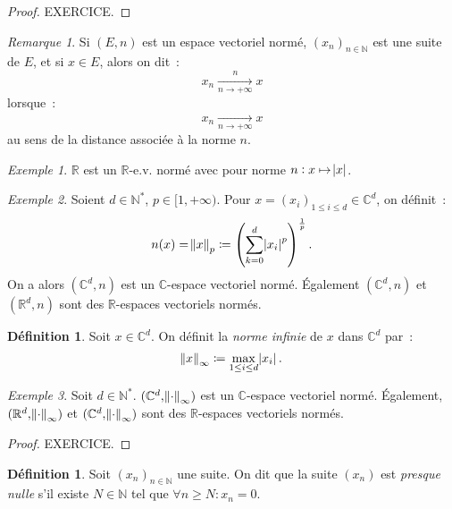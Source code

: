 \documentclass{report}
\theoremstyle{definition}
\newtheorem{déf}[thm]{Définition}
\theoremstyle{remark}
\newtheorem*{rmq}{Remarque}
\newtheorem{ex}{Exemple}[chapter]
\numberwithin{equation}{section}
\newcommand{\C}{\mathbb C}
\newcommand{\R}{\mathbb R}
\newcommand{\N}{\mathbb N}
\newcommand{\Ns}{\N^{*}}
\newcommand{\seq}[3]{\left(#1_{#2}\right)_{#2 \in #3}}
\newcommand{\mconv}[3]{\xrightarrow[#1 \to #2]{#3}}
\newcommand{\pinfty}{{+\infty}}
\newcommand{\evn}{espace vectoriel normé}
\begin{document}
				\begin{proof} EXERCICE.
				\end{proof}

				\begin{rmq} Si $(E, n)$ est un \evn, $\seq xn\N$ est une suite de $E$, et si $x \in E$, alors on dit~:
				\begin{equation}
					x_n \mconv n\pinfty n x
				\end{equation}
				lorsque~:
				\begin{equation}
					x_n \mconv n\pinfty{} x
				\end{equation}
				au sens de la distance associée à la norme $n$.
				\end{rmq}

				\begin{ex} $\R$ est un $\R$-e.v. normé avec pour norme $n : x \mapsto \abs x$. \end{ex}

				\begin{ex} Soient $d \in \Ns$, $p \in [1, \pinfty)$. Pour $x = (x_i)_{1 \leq i \leq d} \in \C^d$, on définit~:
				\begin{equation}
					n(x) = \norm x_p \coloneqq \left(\sum_{k=0}^d\abs {x_i}^p\right)^{\frac 1p}.
				\end{equation}
				On a alors $(\C^d, n)$ est un $\C$-\evn. Également $(\C^d, n)$ et $(\R^d, n)$  sont des $\R$-espaces vectoriels normés.
				\end{ex}

				\begin{déf} Soit $x \in \C^d$. On définit la \textit{norme infinie} de $x$ dans $\C^d$ par~:
				\begin{equation}
					\norm x_\infty \coloneqq \max_{1 \leq i \leq d}\abs {x_i}.
				\end{equation}
				\end{déf}

				\begin{ex} Soit $d \in \Ns$. $(\C^d, \norm \cdot_\infty)$ est un $\C$-\evn. Également, $(\R^d, \norm \cdot_\infty)$
				et $(\C^d, \norm \cdot_\infty)$ sont des $\R$-espaces vectoriels normés. \end{ex}

				\begin{proof} EXERCICE.
				\end{proof}

				\begin{déf} Soit $\seq xn\N$ une suite. On dit que la suite $(x_n)$ est \textit{presque nulle} s'il existe $N \in \N$ tel que
				$\forall n \geq N : x_n = 0$. \end{déf}
\end{document}
